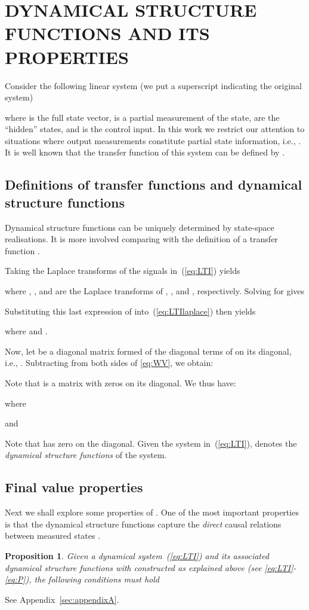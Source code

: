 \documentclass[twocolumn,12pt]{autart}
\theoremstyle{plain}
\newtheorem{proposition}{Proposition}
\newenvironment{proof}[1][Proof]{\begin{trivlist} \item[\hskip \labelsep {\bfseries #1}]}{\end{trivlist}}
\begin{document}
\section{DYNAMICAL STRUCTURE FUNCTIONS AND ITS PROPERTIES}\label{sec:systemmodel}
Consider the following linear system (we put a superscript  indicating the original system)

where  is the full
state vector,  is a partial measurement of the
state,  are the  ``hidden'' states, and
 is the control input. In this work we restrict our attention to situations where output measurements constitute partial state information, i.e., . It is well known that the transfer function of this system can be defined by . 

\subsection{Definitions of transfer functions and dynamical structure functions}
Dynamical structure functions can be uniquely determined by state-space realisations. It is more involved comparing with the definition of a transfer function \cite{08net_rec}.

Taking the Laplace transforms of the signals in~(\ref{eq:LTI}) yields

where , , and  are the Laplace
transforms of , , and , respectively.
Solving for  gives

Substituting this last expression of  into~(\ref{eq:LTIlaplace}) then yields

where  and
.

Now, let  be a
diagonal matrix formed of the diagonal terms of  on its
diagonal, i.e., . Subtracting  from both sides of \eqref{eq:WV}, we obtain:

Note that  is a matrix with zeros on its
diagonal. We thus have:

where

and

Note that  has zero on the diagonal. Given the system in~(\ref{eq:LTI}),  denotes the {\it dynamical structure functions} of the system.



\subsection{Final value properties}
Next we shall explore some properties of . One of the most important properties is that the dynamical structure functions capture the {\em direct} causal relations between measured states .
\begin{proposition}\label{th:qp}
Given a dynamical system~(\ref{eq:LTI}) and its associated dynamical structure
  functions  with  constructed as
  explained above (see \eqref{eq:LTI}-\eqref{eq:P}), the following conditions must hold

\end{proposition}
\begin{proof}
See Appendix~\ref{sec:appendixA}.
\end{proof}
\end{document}
